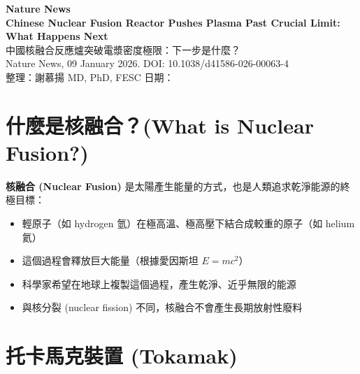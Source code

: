 \documentclass[11pt,a4paper]{article}
\begin{document}
\begin{center}
{\LARGE\bfseries\textcolor{emergency_red}{Nature News}}\\[0.5cm]
{\Large\textbf{Chinese Nuclear Fusion Reactor Pushes Plasma Past Crucial Limit: What Happens Next}}\\[0.3cm]
{\large 中國核融合反應爐突破電漿密度極限：下一步是什麼？}\\[0.5cm]
{\normalsize Nature News, 09 January 2026. DOI: 10.1038/d41586-026-00063-4}\\[0.3cm]
{\normalsize 整理：謝慕揚 MD, PhD, FESC \quad 日期：\mydate}
\end{center}

\vspace{0.5cm}


\section{什麼是核融合？(What is Nuclear Fusion?)}

\textbf{核融合 (Nuclear Fusion)} 是太陽產生能量的方式，也是人類追求乾淨能源的終極目標：

\begin{itemize}[leftmargin=*,itemsep=2pt]
    \item 輕原子（如 hydrogen 氫）在極高溫、極高壓下結合成較重的原子（如 helium 氦）
    \item 這個過程會釋放巨大能量（根據愛因斯坦 $E=mc^2$）
    \item 科學家希望在地球上複製這個過程，產生乾淨、近乎無限的能源
    \item 與核分裂 (nuclear fission) 不同，核融合不會產生長期放射性廢料
\end{itemize}


\section{托卡馬克裝置 (Tokamak)}
\end{document}
